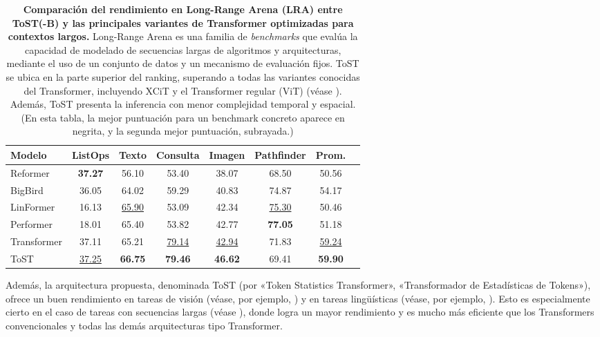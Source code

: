 \documentclass[../../book-main_es.tex]{subfiles}
\begin{document}
\begin{table}
\centering

\begin{tabular}{@{}lccccccc@{}}
\toprule
Modelo        & ListOps  & Texto    & Consulta & Imagen    &
Pathfinder & Prom.      \\
\midrule
\midrule
Reformer              & \textbf{37.27} & 56.10             & 53.40
& 38.07             & 68.50               & 50.56             \\
BigBird               & 36.05             & 64.02             & 59.29
& 40.83             & 74.87                & 54.17             \\
LinFormer         & 16.13             & \underline{65.90} & 53.09
& 42.34             & \underline{75.30}               & 50.46             \\
Performer             & 18.01             & 65.40             & 53.82
& 42.77             & \textbf{77.05}                & 51.18             \\
Transformer           & 37.11             & 65.21             &
\underline{79.14}              & \underline{42.94}             &
71.83              & \underline{59.24}            \\
ToST & \underline{37.25}    & \textbf{66.75}    & \textbf{79.46}
& \textbf{46.62}    &    69.41      &     \textbf{59.90}\\

\bottomrule
\end{tabular}%
\caption{\small \textbf{Comparación del rendimiento en Long-Range Arena (LRA)
    entre ToST(-B) y las principales variantes de Transformer optimizadas para
contextos largos.} Long-Range Arena es una familia de \textit{benchmarks} que evalúa
la capacidad de modelado de secuencias largas de algoritmos y
arquitecturas, mediante el uso de un conjunto de datos y un mecanismo de evaluación fijos. ToST
se ubica en la parte superior del ranking, superando a todas las variantes conocidas
del Transformer, incluyendo XCiT y el Transformer regular (ViT)
(véase ). Además, ToST presenta
la inferencia con menor complejidad temporal y espacial. (En esta tabla, la
    mejor puntuación para un benchmark concreto aparece en negrita, y la segunda mejor
puntuación, subrayada.)}
\label{tab:tost_lra_results}
\end{table}

Además, la arquitectura propuesta, denominada ToST (por «Token Statistics Transformer», 
«Transformador de Estadísticas de Tokens»), ofrece un buen rendimiento en tareas de visión (véase, por ejemplo,
) y en tareas lingüísticas (véase, por ejemplo,
). Esto es especialmente cierto en el caso de tareas con secuencias largas
(véase ), donde logra un mayor
rendimiento y es mucho más eficiente que los Transformers convencionales y
todas las demás arquitecturas tipo Transformer.
\end{document}
